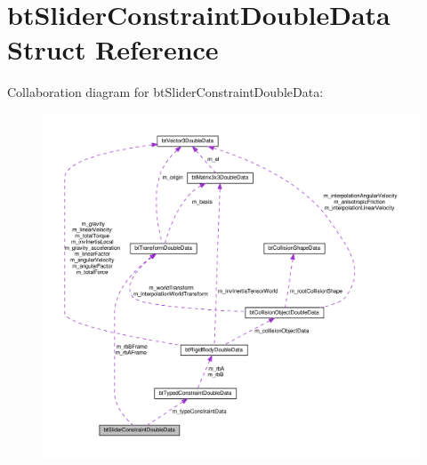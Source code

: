 \hypertarget{structbtSliderConstraintDoubleData}{}\section{bt\+Slider\+Constraint\+Double\+Data Struct Reference}
\label{structbtSliderConstraintDoubleData}


Collaboration diagram for bt\+Slider\+Constraint\+Double\+Data\+:
\nopagebreak
\begin{figure}[H]
\begin{center}
\leavevmode
\includegraphics[width=350pt]{structbtSliderConstraintDoubleData__coll__graph}
\end{center}
\end{figure}
